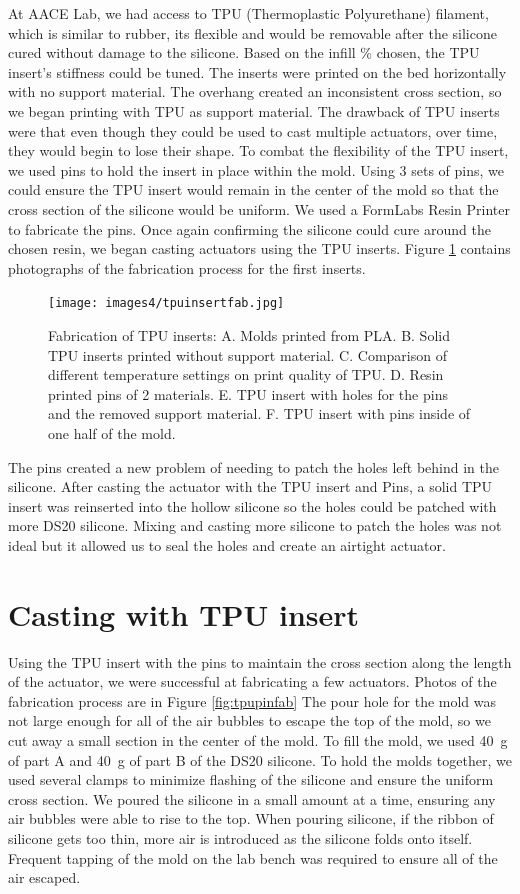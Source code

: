 At AACE Lab, we had access to TPU (Thermoplastic Polyurethane) filament, which is similar to rubber, its flexible and would be removable after the silicone cured without damage to the silicone. Based on the infill \% chosen, the TPU insert's stiffness could be tuned. The inserts were printed on the bed horizontally with no support material. The overhang created an inconsistent cross section, so we began printing with TPU as support material. The drawback of TPU inserts were that even though they could be used to cast multiple actuators, over time, they would begin to lose their shape. To combat the flexibility of the TPU insert, we used pins to hold the insert in place within the mold. Using 3 sets of pins, we could ensure the TPU insert would remain in the center of the mold so that the cross section of the silicone would be uniform. We used a FormLabs Resin Printer to fabricate the pins. Once again confirming the silicone could cure around the chosen resin, we began casting actuators using the TPU inserts. Figure \ref{fig:tpuinsert} contains photographs of the fabrication process for the first inserts. 

\begin{figure}[h]
    \centering
    \texttt{[image: images4/tpuinsertfab.jpg]}
    \caption{Fabrication of TPU inserts: A. Molds printed from PLA. B. Solid TPU inserts printed without support material. C. Comparison of different temperature settings on print quality of TPU. D. Resin printed pins of 2 materials. E. TPU insert with holes for the pins and the removed support material. F. TPU insert with pins inside of one half of the mold.}
    \label{fig:tpuinsert}
\end{figure}

The pins created a new problem of needing to patch the holes left behind in the silicone. After casting the actuator with the TPU insert and Pins, a solid TPU insert was reinserted into the hollow silicone so the holes could be patched with more DS20 silicone. Mixing and casting more silicone to patch the holes was not ideal but it allowed us to seal the holes and create an airtight actuator. 

\section{Casting with TPU insert}

Using the TPU insert with the pins to maintain the cross section along the length of the actuator, we were successful at fabricating a few actuators. Photos of the fabrication process are in Figure \ref{fig:tpupinfab} The pour hole for the mold was not large enough for all of the air bubbles to escape the top of the mold, so we cut away a small section in the center of the mold. To fill the mold, we used 40~g of part A and 40~g of part B of the DS20 silicone. To hold the molds together, we used several clamps to minimize flashing of the silicone and ensure the uniform cross section. We poured the silicone in a small amount at a time, ensuring any air bubbles were able to rise to the top. When pouring silicone, if the ribbon of silicone gets too thin, more air is introduced as the silicone folds onto itself. Frequent tapping of the mold on the lab bench was required to ensure all of the air escaped. 

